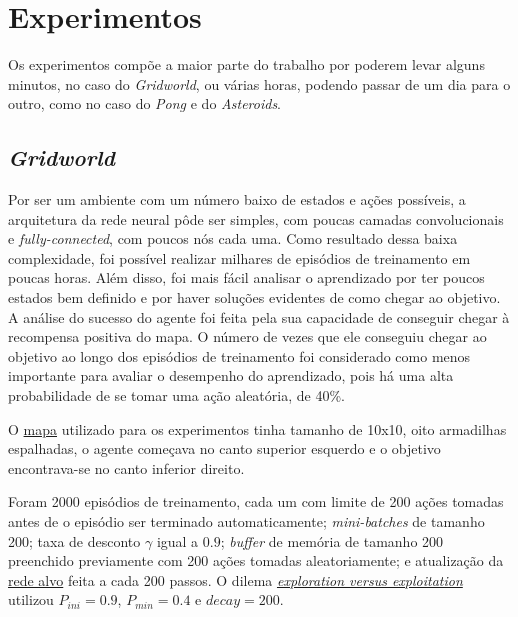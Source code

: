 \section{Experimentos}
\label{sec:exp}

Os experimentos compõe a maior parte do trabalho por poderem levar alguns minutos, no caso do \textit{Gridworld}, ou várias horas, podendo passar de um dia para o outro, como no caso do \textit{Pong} e do \textit{Asteroids}.

\subsection{\textit{Gridworld}}
\label{sec:exp_gridworld}

Por ser um ambiente com um número baixo de estados e ações possíveis, a arquitetura da rede neural pôde ser simples, com poucas camadas convolucionais e \textit{fully-connected}, com poucos nós cada uma.
Como resultado dessa baixa complexidade, foi possível realizar milhares de episódios de treinamento em poucas horas.
Além disso, foi mais fácil analisar o aprendizado por ter poucos estados bem definido e por haver soluções evidentes de como chegar ao objetivo.
A análise do sucesso do agente foi feita pela sua capacidade de conseguir chegar à recompensa positiva do mapa.
O número de vezes que ele conseguiu chegar ao objetivo ao longo dos episódios de treinamento foi considerado como menos importante para avaliar o desempenho do aprendizado, pois há uma alta probabilidade de se tomar uma ação aleatória, de 40\%.

O \hyperref[fig:env_grid]{mapa} utilizado para os experimentos tinha tamanho de 10x10, oito armadilhas espalhadas, o agente começava no canto superior esquerdo e o objetivo encontrava-se no canto inferior direito.

Foram 2000 episódios de treinamento, cada um com limite de 200 ações tomadas antes de o episódio ser terminado automaticamente;
\textit{mini-batches} de tamanho 200;
taxa de desconto $\gamma$ igual a $0.9$; 
\textit{buffer} de memória de tamanho 200 preenchido previamente com 200 ações tomadas aleatoriamente;
e atualização da \hyperref[sec:ft]{rede alvo} feita a cada 200 passos.
O dilema \hyperref[eq:exp_exp_prob]{\textit{exploration versus exploitation}} utilizou $P_{ini} = 0.9$, $P_{min} = 0.4$ e $decay = 200$.

